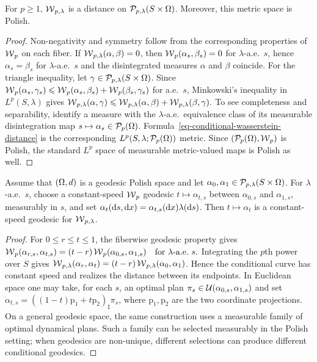\begin{prop}\label{prop-conditional-wasserstein-distance}
For $p\geq1$, $\operatorname{\mathcal{W}}_{p,\lambda}$ is a distance on $\mathcal{P}_{p,\lambda}(S\times\Omega)$. Moreover, this metric space is Polish.
\end{prop}
\begin{proof}
Non-negativity and symmetry follow from the corresponding properties of $\operatorname{\mathcal{W}}_p$ on each fiber. If $\operatorname{\mathcal{W}}_{p,\lambda}(\alpha,\beta)=0$, then $\operatorname{\mathcal{W}}_p(\alpha_s,\beta_s)=0$ for $\lambda$-a.e.\ $s$, hence $\alpha_s=\beta_s$ for $\lambda$-a.e.\ $s$ and the disintegrated measures $\alpha$ and $\beta$ coincide. For the triangle inequality, let $\gamma\in\mathcal{P}_{p,\lambda}(S\times\Omega)$. Since $\operatorname{\mathcal{W}}_p(\alpha_s,\gamma_s)\leqslant\operatorname{\mathcal{W}}_p(\alpha_s,\beta_s)+\operatorname{\mathcal{W}}_p(\beta_s,\gamma_s)$ for a.e.\ $s$, Minkowski's inequality in $L^p(S,\lambda)$ gives
\(\operatorname{\mathcal{W}}_{p,\lambda}(\alpha,\gamma) \leqslant \operatorname{\mathcal{W}}_{p,\lambda}(\alpha,\beta)+\operatorname{\mathcal{W}}_{p,\lambda}(\beta,\gamma).\)
To see completeness and separability, identify a measure with the $\lambda$-a.e.\ equivalence class of its measurable disintegration map $s\mapsto\alpha_s\in\mathcal{P}_p(\Omega)$. Formula~\eqref{eq-conditional-wasserstein-distance} is the corresponding $L^p(S,\lambda;\mathcal{P}_p(\Omega))$ metric. Since $(\mathcal{P}_p(\Omega),\operatorname{\mathcal{W}}_p)$ is Polish, the standard $L^p$ space of measurable metric-valued maps is Polish as well.
\end{proof}
\begin{prop}\label{prop-conditional-wasserstein-geodesics}
Assume that $(\Omega,d)$ is a geodesic Polish space and let $\alpha_0,\alpha_1\in\mathcal{P}_{p,\lambda}(S\times\Omega)$. For $\lambda$-a.e.\ $s$, choose a constant-speed $\operatorname{\mathcal{W}}_p$ geodesic $t\mapsto\alpha_{t,s}$ between $\alpha_{0,s}$ and $\alpha_{1,s}$, measurably in $s$, and set
$\alpha_t(\mathrm{d} s,\mathrm{d} x)=\alpha_{t,s}(\mathrm{d} x)\lambda(\mathrm{d} s)$.
Then $t\mapsto\alpha_t$ is a constant-speed geodesic for $\operatorname{\mathcal{W}}_{p,\lambda}$.
\end{prop}
\begin{proof}
For $0\leq r\leq t\leq1$, the fiberwise geodesic property gives \(\operatorname{\mathcal{W}}_p(\alpha_{r,s},\alpha_{t,s}) = (t-r)\operatorname{\mathcal{W}}_p(\alpha_{0,s},\alpha_{1,s}) \quad\text{for }\lambda\text{-a.e.\ }s.\)
Integrating the $p$th power over $S$ gives
$\operatorname{\mathcal{W}}_{p,\lambda}(\alpha_r,\alpha_t) = (t-r)\operatorname{\mathcal{W}}_{p,\lambda}(\alpha_0,\alpha_1)$.
Hence the conditional curve has constant speed and realizes the distance between its endpoints. In Euclidean space one may take, for each $s$, an optimal plan $\pi_s\in\mathcal{U}(\alpha_{0,s},\alpha_{1,s})$ and set $\alpha_{t,s}=((1-t)\mathrm p_1+t\mathrm p_2)_\sharp\pi_s$, where $\mathrm p_1,\mathrm p_2$ are the two coordinate projections. On a general geodesic space, the same construction uses a measurable family of optimal dynamical plans. Such a family can be selected measurably in the Polish setting; when geodesics are non-unique, different selections can produce different conditional geodesics.
\end{proof}
